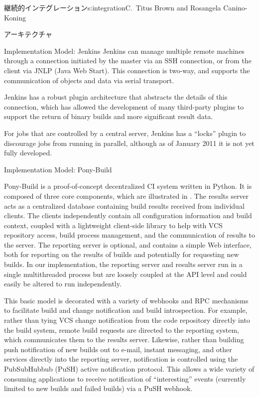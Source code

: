 \begin{aosachapter}{継続的インテグレーション}{s:integration}{C.\ Titus Brown and Rosangela Canino-Koning}
\begin{aosasect1}{アーキテクチャ}
\begin{aosasect2}{Implementation Model: Jenkins}
Jenkins can manage multiple remote machines through a connection
initiated by the master via an SSH connection, or from the client via
JNLP (Java Web Start). This connection is two-way, and supports the
communication of objects and data via serial transport. 

Jenkins has a robust plugin architecture that abstracts the details of
this connection, which has allowed the development of many third-party
plugins to support the return of binary builds and more significant
result data.

For jobs that are controlled by a central server, Jenkins has a
``locks'' plugin to discourage jobs from running in parallel, although
as of January 2011 it is not yet fully developed.

\end{aosasect2}

\begin{aosasect2}{Implementation Model: Pony-Build}


Pony-Build is a proof-of-concept decentralized CI system written in
Python. It is composed of three core components, which are illustrated
in . The results server acts as a
centralized database containing build results received from individual
clients. The clients independently contain all configuration
information and build context, coupled with a lightweight client-side
library to help with VCS repository access, build process management,
and the communication of results to the server. The reporting server
is optional, and contains a simple Web interface, both for reporting
on the results of builds and potentially for requesting new builds. In
our implementation, the reporting server and results server run in a
single multithreaded process but are loosely coupled at the API level
and could easily be altered to run independently.

This basic model is decorated with a variety of webhooks and RPC
mechanisms to facilitate build and change notification and build
introspection. For example, rather than tying VCS change notification
from the code repository directly into the build system, remote build
requests are directed to the reporting system, which communicates them
to the results server. Likewise, rather than building push
notification of new builds out to e-mail, instant messaging, and other
services directly into the reporting server, notification is
controlled using the PubSubHubbub (PuSH) active notification
protocol. This allows a wide variety of consuming applications to
receive notification of ``interesting'' events (currently limited to
new builds and failed builds) via a PuSH webhook.


\end{aosasect2}
\end{aosasect1}
\end{aosachapter}
